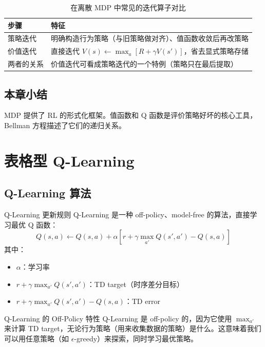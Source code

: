 \documentclass[a4paper]{article}
\begin{document}
\begin{table}[H]
\centering
\begin{tabular}{ll}
\toprule
步骤 & 特征 \\
\midrule
策略迭代 & 明确构造行为策略（与旧策略做对齐）、值函数收敛后再改策略 \\
价值迭代 & 直接迭代 $V(s) \leftarrow \max_a [R+\gamma V(s')]$，省去显式策略存储 \\
两者的关系 & 价值迭代可看成策略迭代的一个特例（策略只在最后提取） \\
\bottomrule
\end{tabular}
\caption{在离散 MDP 中常见的迭代算子对比}
\label{tab:mdp-iteration}
\end{table}

\subsection{本章小结}

MDP 提供了 RL 的形式化框架。值函数和 Q 函数是评价策略好坏的核心工具，Bellman 方程描述了它们的递归关系。

\section{表格型 Q-Learning}

\subsection{Q-Learning 算法}

\begin{importantbox}{Q-Learning 更新规则}
Q-Learning 是一种 off-policy、model-free 的算法，直接学习最优 Q 函数：
$$Q(s, a) \leftarrow Q(s, a) + \alpha \left[r + \gamma \max_{a'} Q(s', a') - Q(s, a)\right]$$
其中：
\begin{itemize}
    \item $\alpha$：学习率
    \item $r + \gamma \max_{a'} Q(s', a')$：TD target（时序差分目标）
    \item $r + \gamma \max_{a'} Q(s', a') - Q(s, a)$：TD error
\end{itemize}
\end{importantbox}

\begin{knowledgebox}{Q-Learning 的 Off-Policy 特性}
Q-Learning 是 off-policy 的，因为它使用 $\max_{a'}$ 来计算 TD target，无论行为策略（用来收集数据的策略）是什么。这意味着我们可以用任意策略（如 $\epsilon$-greedy）来探索，同时学习最优策略。
\end{knowledgebox}
\end{document}

